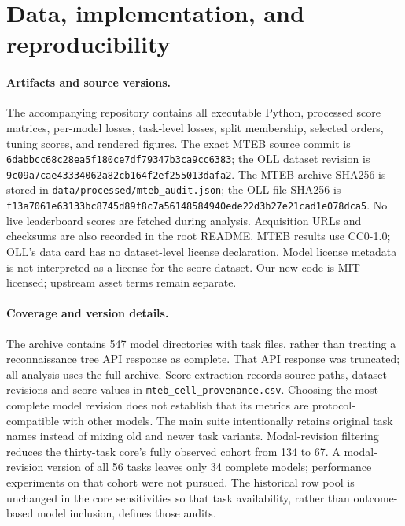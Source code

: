 \documentclass{article}
\begin{document}
\section{Data, implementation, and reproducibility}
\label{app:reproduce}
\paragraph{Artifacts and source versions.}
The accompanying repository contains all executable Python, processed score matrices, per-model losses, task-level losses, split membership, selected orders, tuning scores, and rendered figures. The exact MTEB source commit is \texttt{6dabbcc68c28ea5f180ce7df79347b3ca9cc6383}; the OLL dataset revision is \texttt{9c09a7cae43334062a82cb164f2ef255013dafa2}. The MTEB archive SHA256 is stored in \texttt{data/processed/mteb\_audit.json}; the OLL file SHA256 is \texttt{f13a7061e63133bc8745d89f8c7a56148584940ede22d3b27e21cad1e078dca5}. No live leaderboard scores are fetched during analysis. Acquisition URLs and checksums are also recorded in the root README. MTEB results use CC0-1.0; OLL's data card has no dataset-level license declaration. Model license metadata is not interpreted as a license for the score dataset. Our new code is MIT licensed; upstream asset terms remain separate.

\paragraph{Coverage and version details.}
The archive contains 547 model directories with task files, rather than treating a reconnaissance tree API response as complete. That API response was truncated; all analysis uses the full archive. Score extraction records source paths, dataset revisions and score values in \texttt{mteb\_cell\_provenance.csv}. Choosing the most complete model revision does not establish that its metrics are protocol-compatible with other models. The main suite intentionally retains original task names instead of mixing old and newer task variants. Modal-revision filtering reduces the thirty-task core's fully observed cohort from 134 to 67. A modal-revision version of all 56 tasks leaves only 34 complete models; performance experiments on that cohort were not pursued. The historical row pool is unchanged in the core sensitivities so that task availability, rather than outcome-based model inclusion, defines those audits.
\end{document}
